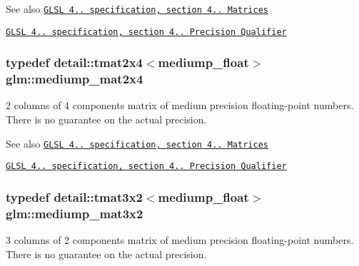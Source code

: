 \begin{DoxySeeAlso}{\-See also}
\href{http://www.opengl.org/registry/doc/GLSLangSpec.4.20.8.pdf}{\tt \-G\-L\-S\-L 4.. specification, section 4.. \-Matrices} 

\href{http://www.opengl.org/registry/doc/GLSLangSpec.4.20.8.pdf}{\tt \-G\-L\-S\-L 4.. specification, section 4.. \-Precision \-Qualifier} 
\end{DoxySeeAlso}
\hypertarget{group__core__precision_ga2e80caa3f70e504bd574664b1029e627}{
\subsubsection[{mediump\-\_\-mat2x4}]{\setlength{\rightskip}{0pt plus 5cm}typedef detail\-::tmat2x4$<$mediump\-\_\-float$>$ {\bf glm\-::mediump\-\_\-mat2x4}}}\label{group__core__precision_ga2e80caa3f70e504bd574664b1029e627}
2 columns of 4 components matrix of medium precision floating-\/point numbers. \-There is no guarantee on the actual precision.

\begin{DoxySeeAlso}{\-See also}
\href{http://www.opengl.org/registry/doc/GLSLangSpec.4.20.8.pdf}{\tt \-G\-L\-S\-L 4.. specification, section 4.. \-Matrices} 

\href{http://www.opengl.org/registry/doc/GLSLangSpec.4.20.8.pdf}{\tt \-G\-L\-S\-L 4.. specification, section 4.. \-Precision \-Qualifier} 
\end{DoxySeeAlso}
\hypertarget{group__core__precision_ga74c660239e7f6b76796f1b4990083ec6}{
\subsubsection[{mediump\-\_\-mat3x2}]{\setlength{\rightskip}{0pt plus 5cm}typedef detail\-::tmat3x2$<$mediump\-\_\-float$>$ {\bf glm\-::mediump\-\_\-mat3x2}}}\label{group__core__precision_ga74c660239e7f6b76796f1b4990083ec6}
3 columns of 2 components matrix of medium precision floating-\/point numbers. \-There is no guarantee on the actual precision.

